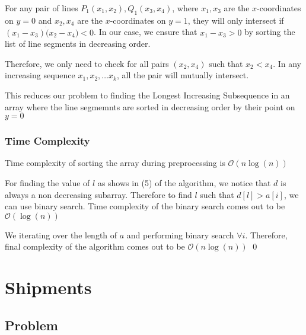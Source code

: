 \documentclass[12pt]{article}
\begin{document}
For any pair of lines $P_1(x_1, x_2), Q_1(x_3, x_4)$, where $x_1, x_3$ are the $x$-coordinates on $y = 0$ and $x_2, x_4$ are the $x$-coordinates on $y = 1$, they will only intersect if $(x_1 - x_3) \dot (x_2 - x_4) < 0$. In our case, we ensure that $x_1 - x_3 > 0$ by sorting the list of line segments in decreasing order.

Therefore, we only need to check for all pairs $(x_2, x_4)$ such that $x_2 < x_4$. In any increasing sequence $x_1, x_2, \dots x_k$, all the pair will mutually intersect.

This reduces our problem to finding the Longest Increasing Subsequence in an array where the line segmemnts are sorted in decreasing order by their point on $y = 0$



\subsubsection{Time Complexity}

Time complexity of sorting the array during preprocessing is $\mathcal{O}(n\log(n))$

For finding the value of $l$ as shows in (5) of the algorithm, we notice that $d$ is always a non decreasing subarray. Therefore to find $l$ such that $d[l] > a[i]$, we can use binary search. Time complexity of the binary search comes out to be $\mathcal{O}(\log(n))$

We iterating over the length of $a$ and performing binary search $\forall i$. Therefore, final complexity of the algorithm comes out to be $\mathcal{O}(n\log(n))$
\qed

\pagebreak

\section{Shipments}

\subsection{Problem}
\end{document}
